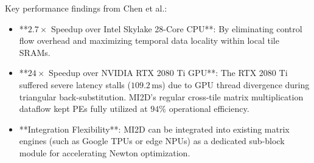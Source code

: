 Key performance findings from Chen et al.:
\begin{itemize}[leftmargin=*]
    \item **$2.7\times$ Speedup over Intel Skylake 28-Core CPU**: By eliminating control flow overhead and maximizing temporal data locality within local tile SRAMs.
    \item **$24\times$ Speedup over NVIDIA RTX 2080 Ti GPU**: The RTX 2080 Ti suffered severe latency stalls ($109.2\,\text{ms}$) due to GPU thread divergence during triangular back-substitution. MI2D's regular cross-tile matrix multiplication dataflow kept PEs fully utilized at $94\%$ operational efficiency.
    \item **Integration Flexibility**: MI2D can be integrated into existing matrix engines (such as Google TPUs or edge NPUs) as a dedicated sub-block module for accelerating Newton optimization.
\end{itemize}
